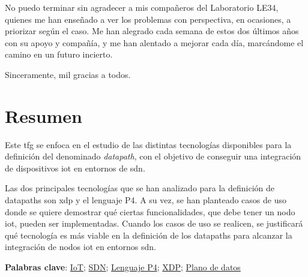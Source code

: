 No puedo terminar sin agradecer a mis compañeros del Laboratorio LE34, quienes me han enseñado a ver los problemas con perspectiva, en ocasiones, a priorizar según el caso. Me han alegrado cada semana de estos dos últimos años con su apoyo y compañía, y  me han alentado a mejorar cada día, marcándome el camino en un futuro incierto.

\vspace{0.5cm}

Sinceramente, mil gracias a todos.




\cleardoublepage %



\chapter{Resumen}
\thispagestyle{empty}
Este \gls{tfg} se enfoca en el estudio de las distintas tecnologías disponibles para la definición del denominado \textit{datapath}, con el objetivo de conseguir una integración de dispositivos \gls{iot} en entornos de \gls{sdn}. \newline

Las dos principales tecnologías que se han analizado para la definición de datapaths son \gls{xdp} y el lenguaje P4. A su vez, se han planteado casos de uso donde se quiere demostrar qué ciertas funcionalidades, que debe tener un nodo \gls{iot}, pueden ser implementadas. Cuando los casos de uso se realicen, se justificará qué tecnología es más viable en la definición de los datapaths para alcanzar la integración de nodos \gls{iot} en entornos \gls{sdn}.

\vspace{1cm}

	\textbf{Palabras clave}: \href{https://scholar.google.es/scholar?q=Internet+of+Things}{IoT}; \href{https://www.opennetworking.org/sdn-definition}{SDN}; 
	\href{https://p4.org/}{Lenguaje P4}; \href{https://scholar.google.es/scholar?q=XDP+linux}{XDP};
	\href{https://scholar.google.es/scholar?q=Datapaths}{Plano de datos}


\cleardoublepage %



